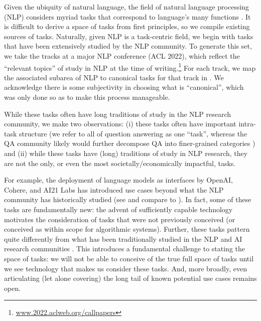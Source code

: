Given the ubiquity of natural language, the field of natural language processing (NLP) considers myriad tasks that correspond to language's many functions \citep{jurafsky2000speech}.
It is difficult to derive a space of tasks from first principles, so we compile existing sources of tasks.
Naturally, given NLP is a task-centric field, we begin with tasks that have been extensively studied by the NLP community.
To generate this set, we take the tracks at a major NLP conference (ACL 2022), which reflect the ``relevant topics'' of study in NLP at the time of writing.\footnote{\url{www.2022.aclweb.org/callpapers}}
For each track, we map the associated subarea of NLP to canonical tasks for that track in .
We acknowledge there is some subjectivity in choosing what is ``canonical'', which was only done so as to make this process manageable.


While these tasks often have long traditions of study in the NLP research community, we make two observations:
(i) these tasks often have important intra-task structure (\eg we refer to all of question answering as one ``task'', whereas the QA community likely would further decompose QA into finer-grained categories \citep{rogers2021qa})
and (ii) while these tasks have (long) traditions of study in NLP research, they are not the only, or even the most societally/economically impactful, tasks.

For example, the deployment of language models as interfaces by OpenAI, Cohere, and AI21 Labs has introduced use cases beyond what the NLP community has historically studied (see  and compare to ).
In fact, some of these tasks are fundamentally new: the advent of sufficiently capable technology motivates the consideration of tasks that were not previously conceived (or conceived as within scope for algorithmic systems).
Further, these tasks pattern quite differently from what has been traditionally studied in the NLP and AI research communities \citep[see][]{ouyang2022instructions}.
This introduces a fundamental challenge to stating the space of tasks: we will not be able to conceive of the true full space of tasks until we see technology that makes us consider these tasks.
And, more broadly, even articulating (let alone covering) the long tail of known potential use cases remains open. 

